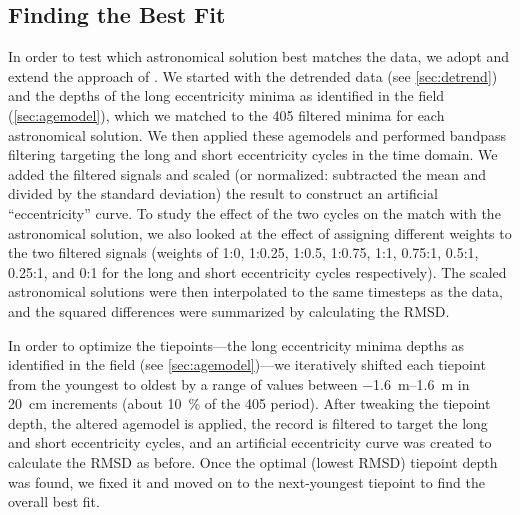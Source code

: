 \documentclass[draft]{agujournal2019}
\begin{document}
\subsection{Finding the Best Fit}\label{sec:algorithm}

In order to test which astronomical solution best matches the data, we adopt and extend the approach of .
We started with the detrended data (see \cref{sec:detrend}) and the depths of the long eccentricity minima as identified in the field (\cref{sec:agemodel}), which we matched to the \qty{405}{\kiloyear} filtered minima for each astronomical solution.
We then applied these agemodels and performed bandpass filtering targeting the long and short eccentricity cycles in the time domain.
We added the filtered signals and scaled (or normalized: subtracted the mean and divided by the standard deviation) the result to construct an artificial ``eccentricity'' curve.
To study the effect of the two cycles on the match with the astronomical solution, we also looked at the effect of assigning different weights to the two filtered signals (weights of 1:0, 1:0.25, 1:0.5, 1:0.75, 1:1, 0.75:1, 0.5:1, 0.25:1, and 0:1 for the long and short eccentricity cycles respectively).
The scaled astronomical solutions were then interpolated to the same timesteps as the data, and the squared differences were summarized by calculating the \gls{RMSD}.

In order to optimize the tiepoints---the long eccentricity minima depths as identified in the field (see \cref{sec:agemodel})---we iteratively shifted each tiepoint from the youngest to oldest by a range of values between \qtyrange[range-phrase=~to~]{-1.6}{1.6}{\metre} in \qty{20}{\centi\metre} increments (about \qty{10}{\percent} of the \qty{405}{\kiloyear} period).
After tweaking the tiepoint depth, the altered agemodel is applied, the record is filtered to target the long and short eccentricity cycles, and an artificial eccentricity curve was created to calculate the \gls{RMSD} as before.
Once the optimal (lowest \gls{RMSD}) tiepoint depth was found, we fixed it and moved on to the next-youngest tiepoint to find the overall best fit.
\end{document}
